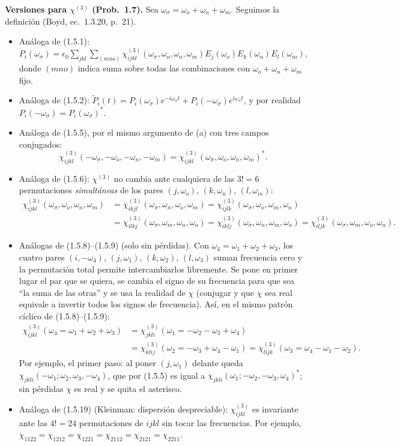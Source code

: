  \textbf{Versiones para $\chi^{(3)}$ (Prob.~1.7).} Sea $\omega_\sigma=\omega_o+\omega_n+\omega_m$. Seguimos la definición (Boyd, ec.~1.3.20, p.~21).
\begin{itemize}
\item Análoga de (1.5.1):
$\displaystyle P_i(\omega_\sigma)=\epsilon_0\sum_{jkl}\sum_{(mno)}\chi^{(3)}_{ijkl}(\omega_\sigma,\omega_o,\omega_n,\omega_m)E_j(\omega_o)E_k(\omega_n)E_l(\omega_m)$,
donde $(mno)$ indica suma sobre todas las combinaciones con $\omega_o+\omega_n+\omega_m$ fijo.
\item Análoga de (1.5.2): $\tilde P_i(t)=P_i(\omega_\sigma)e^{-i\omega_\sigma t}+P_i(-\omega_\sigma)e^{i\omega_\sigma t}$, y por realidad $P_i(-\omega_\sigma)=P_i(\omega_\sigma)^*$.
\item Análoga de (1.5.5), por el mismo argumento de (a) con tres campos conjugados:
\[\chi^{(3)}_{ijkl}(-\omega_\sigma,-\omega_o,-\omega_n,-\omega_m)=\chi^{(3)}_{ijkl}(\omega_\sigma,\omega_o,\omega_n,\omega_m)^*.\]
\item Análoga de (1.5.6): $\chi^{(3)}$ no cambia ante cualquiera de las $3!=6$ permutaciones \emph{simultáneas} de los pares
$(j,\omega_o)$, $(k,\omega_n)$, $(l,\omega_m)$:
\begin{align*}
\chi^{(3)}_{ijkl}(\omega_\sigma,\omega_o,\omega_n,\omega_m)&=\chi^{(3)}_{ikjl}(\omega_\sigma,\omega_n,\omega_o,\omega_m)=\chi^{(3)}_{ijlk}(\omega_\sigma,\omega_o,\omega_m,\omega_n)\\
&=\chi^{(3)}_{ilkj}(\omega_\sigma,\omega_m,\omega_n,\omega_o)=\chi^{(3)}_{iklj}(\omega_\sigma,\omega_n,\omega_m,\omega_o)=\chi^{(3)}_{iljk}(\omega_\sigma,\omega_m,\omega_o,\omega_n).
\end{align*}
\item Análogas de (1.5.8)–(1.5.9) (solo sin pérdidas). Con $\omega_4=\omega_1+\omega_2+\omega_3$, los cuatro pares $(i,-\omega_4)$, $(j,\omega_1)$,
$(k,\omega_2)$, $(l,\omega_3)$ suman frecuencia cero y la permutación total permite intercambiarlos libremente. Se pone en primer lugar
el par que se quiera, se cambia el signo de su frecuencia para que sea ``la suma de las otras'' y se usa la realidad de $\chi$
(conjugar y que $\chi$ sea real equivale a invertir todos los signos de frecuencia). Así, en el mismo patrón cíclico de (1.5.8)–(1.5.9):
\begin{align*}
\chi^{(3)}_{ijkl}(\omega_4=\omega_1+\omega_2+\omega_3)&=\chi^{(3)}_{jkli}(\omega_1=-\omega_2-\omega_3+\omega_4)\\
&=\chi^{(3)}_{klij}(\omega_2=-\omega_3+\omega_4-\omega_1)=\chi^{(3)}_{lijk}(\omega_3=\omega_4-\omega_1-\omega_2).
\end{align*}
Por ejemplo, el primer paso: al poner $(j,\omega_1)$ delante queda $\chi_{jkli}(-\omega_1;\omega_2,\omega_3,-\omega_4)$, que por (1.5.5)
es igual a $\chi_{jkli}(\omega_1;-\omega_2,-\omega_3,\omega_4)^*$; sin pérdidas $\chi$ es real y se quita el asterisco.
\item Análoga de (1.5.19) (Kleinman: dispersión despreciable): $\chi^{(3)}_{ijkl}$ es invariante ante las $4!=24$ permutaciones de
$ijkl$ sin tocar las frecuencias. Por ejemplo, $\chi_{1122}=\chi_{1212}=\chi_{1221}=\chi_{2112}=\chi_{2121}=\chi_{2211}$.
\end{itemize}
